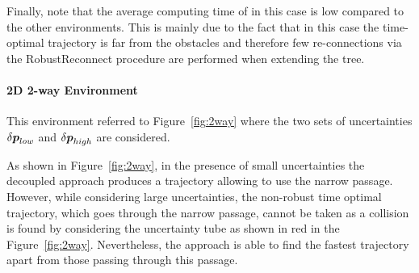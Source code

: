 Finally, note that the average computing time of  in this case is low compared to the other environments. 
This is mainly due to the fact that in this case the time-optimal trajectory is far from the obstacles and therefore few re-connections via the  RobustReconnect procedure are performed when extending the tree.


\paragraph{2D 2-way Environment} 


This environment referred to Figure~\ref{fig:2way} where the two sets of uncertainties $\delta\boldsymbol{p}_{low}$ and $\delta\boldsymbol{p}_{high}$ are considered.

As shown in Figure~\ref{fig:2way}, in the presence of small uncertainties the decoupled approach produces a trajectory allowing to use the narrow passage. 
However, while considering large uncertainties, the non-robust time optimal trajectory, which goes through the narrow passage, cannot be taken as a collision is found by considering the uncertainty tube as shown in red in the Figure~\ref{fig:2way}.
Nevertheless, the approach is able to find the fastest trajectory apart from those passing through this passage.

